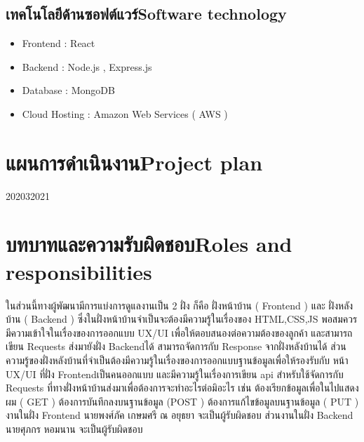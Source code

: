 \subsection{\ifcpe เทคโนโลยีด้านซอฟต์แวร์\else Software technology\fi}
\begin{itemize}
    \item Frontend : React 	
    \item Backend : Node.js , Express.js 
    \item Database : MongoDB
    \item Cloud Hosting : Amazon Web Services ( AWS )
\end{itemize}



\section{\ifcpe แผนการดำเนินงาน\else Project plan\fi}

\begin{plan}{6}{2020}{3}{2021}




\end{plan}

\section{\ifcpe บทบาทและความรับผิดชอบ\else Roles and responsibilities\fi}
ในส่วนนี้ทางผู้พัฒนามีการแบ่งการดูแลงานเป็น 2 ฝั่ง ก็คือ ฝั่งหน้าบ้าน 
( Frontend ) และ ฝั่งหลังบ้าน ( Backend ) ซึ่งในฝั่งหน้าบ้านจำเป็นจะต้องมีความรู้ในเรื่องของ HTML,CSS,JS พอสมควร มีความเข้าใจในเรื่องของการออกแบบ UX/UI เพื่อให้ตอบสนองต่อความต้องของลูกค้า และสามารถเขียน Requests ส่งมายังฝั่ง Backendได้ สามารถจัดการกับ Response จากฝั่งหลังบ้านได้ ส่วนความรู้ของฝั่งหลังบ้านที่จำเป็นต้องมีความรู้ในเรื่องของการออกแบบฐานข้อมูลเพื่อให้รองรับกับ หน้า UX/UI ที่ฝั่ง Frontendเป็นคนออกแบบ และมีความรู้ในเรื่องการเขียน api สำหรับใช้จัดการกับ Requests ที่ทางฝั่งหน้าบ้านส่งมาเพื่อต้องการจะทำอะไรต่อมิอะไร เช่น ต้องเรียกข้อมูลเพื่อในไปแสดงผม ( GET )
ต้องการบันทึกลงบนฐานข้อมูล (POST ) ต้องการแก้ไขข้อมูลบนฐานข้อมูล ( PUT )
งานในฝั่ง Frontend นายพงศ์ภัค เกษมศรี ณ อยุธยา จะเป็นผู้รับผิดชอบ 
ส่วนงานในฝั่ง Backend นายศุภกร หอมนาน  จะเป็นผู้รับผิดชอบ


